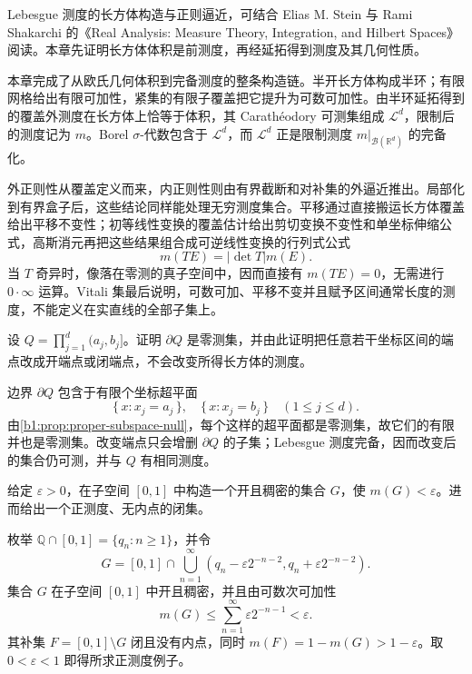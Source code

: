 \ProseParagraphBreak

Lebesgue 测度的长方体构造与正则逼近，可结合 Elias M. Stein 与 Rami Shakarchi 的《Real Analysis: Measure Theory, Integration, and Hilbert Spaces》\cite{Stein2005Real}阅读。本章先证明长方体体积是前测度，再经延拓得到测度及其几何性质。







\begin{chaptersummary}
本章完成了从欧氏几何体积到完备测度的整条构造链。半开长方体构成半环；有限网格给出有限可加性，紧集的有限子覆盖把它提升为可数可加性。由半环延拓得到的覆盖外测度在长方体上恰等于体积，其 Carathéodory 可测集组成 \(\mathcal L^d\)，限制后的测度记为 \(m\)。Borel \(\sigma\)-代数包含于 \(\mathcal L^d\)，而 \(\mathcal L^d\) 正是限制测度 \(m|_{\mathcal B(\mathbb R^d)}\) 的完备化。

\ProseParagraphBreak

外正则性从覆盖定义而来，内正则性则由有界截断和对补集的外逼近推出。局部化到有界盒子后，这些结论同样能处理无穷测度集合。平移通过直接搬运长方体覆盖给出平移不变性；初等线性变换的覆盖估计给出剪切变换不变性和单坐标伸缩公式，高斯消元再把这些结果组合成可逆线性变换的行列式公式
\[
m(TE)=\lvert\det T\rvert m(E).
\]
当 \(T\) 奇异时，像落在零测的真子空间中，因而直接有 \(m(TE)=0\)，无需进行 \(0\cdot\infty\) 运算。Vitali 集最后说明，可数可加、平移不变并且赋予区间通常长度的测度，不能定义在实直线的全部子集上。
\end{chaptersummary}

\BookExercises

\begin{exercise}\label{b1:ex:0301}
设 \(Q=\prod_{j=1}^d(a_j,b_j]\)。证明 \(\partial Q\) 是零测集，并由此证明把任意若干坐标区间的端点改成开端点或闭端点，不会改变所得长方体的测度。
\end{exercise}
\begin{solution}
边界 \(\partial Q\) 包含于有限个坐标超平面
\[
\{\,x:x_j=a_j\,\},\quad \{\,x:x_j=b_j\,\}
\quad (1\leq j\leq d).
\]
由\cref{b1:prop:proper-subspace-null}，每个这样的超平面都是零测集，故它们的有限并也是零测集。改变端点只会增删 \(\partial Q\) 的子集；Lebesgue 测度完备，因而改变后的集合仍可测，并与 \(Q\) 有相同测度。
\end{solution}

\begin{exercise}\label{b1:ex:0302}
给定 \(\varepsilon>0\)，在子空间 \([0,1]\) 中构造一个开且稠密的集合 \(G\)，使 \(m(G)<\varepsilon\)。进而给出一个正测度、无内点的闭集。
\end{exercise}
\begin{solution}
枚举 \(\mathbb Q\cap[0,1]=\{q_n:n\geq1\}\)，并令
\[
G=[0,1]\cap\bigcup_{n=1}^{\infty}
\left(q_n-\varepsilon2^{-n-2},q_n+\varepsilon2^{-n-2}\right).
\]
集合 \(G\) 在子空间 \([0,1]\) 中开且稠密，并且由可数次可加性
\[
m(G)\leq\sum_{n=1}^{\infty}\varepsilon2^{-n-1}<\varepsilon.
\]
其补集 \(F=[0,1]\setminus G\) 闭且没有内点，同时
\(m(F)=1-m(G)>1-\varepsilon\)。取 \(0<\varepsilon<1\) 即得所求正测度例子。
\end{solution}

